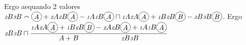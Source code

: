 Ergo aequando 2 valores $ {\scriptstyle \textit{2}}B{\scriptstyle \textit{3}}B \smallfrown \raisebox{-1.0ex}{\begin{tikzpicture}\draw (0,0) circle (0.25cm) node {\textit{A}};\end{tikzpicture}} +{\scriptstyle \textit{2}}A{\scriptstyle \textit{2}}B \raisebox{-1.0ex}{\begin{tikzpicture}\draw (0,0) circle (0.25cm) node {\textit{A}};\end{tikzpicture}} -{\scriptstyle \textit{1}}A{\scriptstyle \textit{1}}B \raisebox{-1.0ex}{\begin{tikzpicture}\draw (0,0) circle (0.25cm) node {\textit{A}};\end{tikzpicture}} \sqcap {\scriptstyle \textit{1}}A{\scriptstyle \textit{2}}A \raisebox{-1.0ex}{\begin{tikzpicture}\draw (0,0) circle (0.25cm) node {\textit{A}};\end{tikzpicture}} + {\scriptstyle \textit{1}}B{\scriptstyle \textit{2}}B \raisebox{-1.0ex}{\begin{tikzpicture}\draw (0,0) circle (0.25cm) node {\textit{B}};\end{tikzpicture}} -{\scriptstyle \textit{2}}B{\scriptstyle \textit{3}}B \raisebox{-1.0ex}{\begin{tikzpicture}\draw (0,0) circle (0.25cm) node {\textit{B}};\end{tikzpicture}}$. 
%
Ergo ${\scriptstyle \textit{2}}B{\scriptstyle \textit{3}}B \sqcap \displaystyle\frac{{\scriptstyle \textit{1}}A{\scriptstyle \textit{2}}A \raisebox{-1.0ex}{\begin{tikzpicture}\draw (0,0) circle (0.25cm) node {\textit{A}};\end{tikzpicture}} +{\scriptstyle \textit{1}}B{\scriptstyle \textit{2}}B \raisebox{-1.0ex}{\begin{tikzpicture}\draw (0,0) circle (0.25cm) node {\textit{B}};\end{tikzpicture}} -{\scriptstyle \textit{2}}A{\scriptstyle \textit{2}}B \raisebox{-1.0ex}{\begin{tikzpicture}\draw (0,0) circle (0.25cm) node {\textit{A}};\end{tikzpicture}} +{\scriptstyle \textit{1}}A{\scriptstyle \textit{1}}B \raisebox{-1.0ex}{\begin{tikzpicture}\draw (0,0) circle (0.25cm) node {\textit{A}};\end{tikzpicture}}}{A+B \phantom{AAAAAAAA} {\scriptstyle \textit{2}}B{\scriptstyle \textit{3}}B}$%
%
